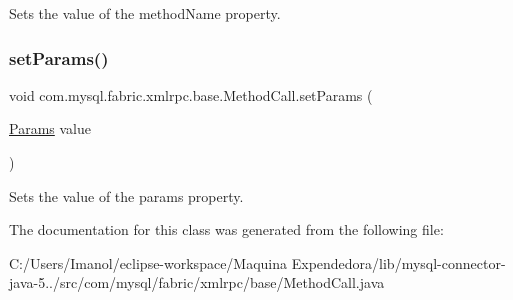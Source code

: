 Sets the value of the method\+Name property. \mbox{\label{classcom_1_1mysql_1_1fabric_1_1xmlrpc_1_1base_1_1_method_call_ac16d181c5296e8beecbf82c9f6b0c72f}} 
\subsubsection{\texorpdfstring{set\+Params()}{setParams()}}
{\footnotesize\ttfamily void com.\+mysql.\+fabric.\+xmlrpc.\+base.\+Method\+Call.\+set\+Params (\begin{DoxyParamCaption}\item[{\mbox{\hyperlink{classcom_1_1mysql_1_1fabric_1_1xmlrpc_1_1base_1_1_params}{Params}}}]{value }\end{DoxyParamCaption})}

Sets the value of the params property. 

The documentation for this class was generated from the following file\+:\begin{DoxyCompactItemize}
\item 
C\+:/\+Users/\+Imanol/eclipse-\/workspace/\+Maquina Expendedora/lib/mysql-\/connector-\/java-\/5../src/com/mysql/fabric/xmlrpc/base/Method\+Call.\+java\end{DoxyCompactItemize}
